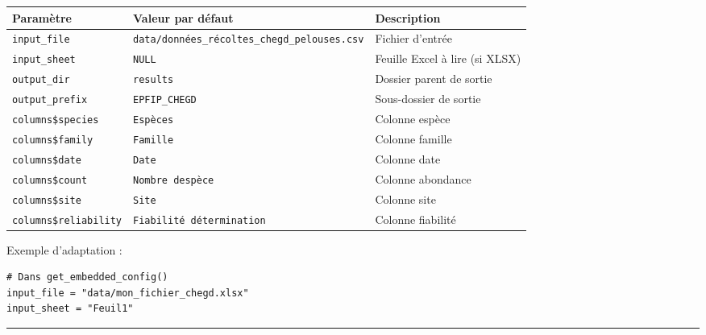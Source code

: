 {\def\LTcaptype{none} %
\begin{longtable}[]{@{}
  >{\raggedright\arraybackslash}p{}
  >{\raggedright\arraybackslash}p{}
  >{\raggedright\arraybackslash}p{}@{}}
\toprule\noalign{}
\begin{minipage}[b]{\linewidth}\raggedright
Paramètre
\end{minipage} & \begin{minipage}[b]{\linewidth}\raggedright
Valeur par défaut
\end{minipage} & \begin{minipage}[b]{\linewidth}\raggedright
Description
\end{minipage} \\
\midrule\noalign{}
\endhead
\bottomrule\noalign{}
\endlastfoot
\texttt{input\_file} &
\texttt{data/données\_récoltes\_chegd\_pelouses.csv} & Fichier
d'entrée \\
\texttt{input\_sheet} & \texttt{NULL} & Feuille Excel à lire (si
XLSX) \\
\texttt{output\_dir} & \texttt{results} & Dossier parent de sortie \\
\texttt{output\_prefix} & \texttt{EPFIP\_CHEGD} & Sous-dossier de
sortie \\
\texttt{columns\$species} & \texttt{Espèces} & Colonne espèce \\
\texttt{columns\$family} & \texttt{Famille} & Colonne famille \\
\texttt{columns\$date} & \texttt{Date} & Colonne date \\
\texttt{columns\$count} & \texttt{Nombre\ d\textquotesingle{}espèce} &
Colonne abondance \\
\texttt{columns\$site} & \texttt{Site} & Colonne site \\
\texttt{columns\$reliability} & \texttt{Fiabilité\ détermination} &
Colonne fiabilité \\
\end{longtable}
}

Exemple d'adaptation :

\begin{verbatim}
# Dans get_embedded_config()
input_file = "data/mon_fichier_chegd.xlsx"
input_sheet = "Feuil1"
\end{verbatim}

\begin{center}\rule{0.5\linewidth}{0.5pt}\end{center}

